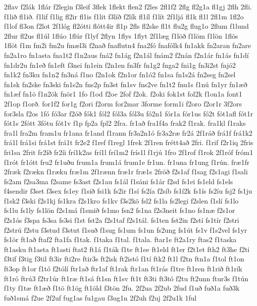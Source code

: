 {2flav
f2lák
1flár
f2legin
f3leif
3flek
1flekt
flen2
f2les
2fl1f2
2flg
fl2g1a
fl1gj
2flh
2fli.
f1lið
fl1ið.
f1lif
f1lig
fl2ir
fl1is
f1lit
f3líð
f2lík
fl1íl
f1lít
2f1ljá
fl1k
fl1l
2fl1m
1fl2o
f1lof
fl3on
f2lot
2f1lóg
fl2ótti
flótt4ir
fl1p
2fls
fl2ske
fl1t
flu2g
flug1o
2flum
f1lund
2flur
fl2us
fl1úl
1flúo
1flúr
f1lyf
2flyn
1flys
1flyt
2f1læg
f1löð
f1löm
f1lön
1flös
1flöt
f1m
fm2i
fm2u
fmæl3i
f2nað
fnaflutn4
fna2fó
fnafólk4
fn1akk
fn2aran
fn2are
fn2a1ro
fn1asta
fna1t2
f1n2aus
fná2
fn1ág
f2n1ál
fnám2
f2nán
f2n1ár
fn1ás
fn1dí
fn1dr2u
fn1eð
fn1eft
f3nei
fn1ein
f2n1en
fn3fr
fn1g2
fnga2
fni1g
fn3i2st
fnjó2
fn1k2
fn3ku
fn1n2
fn3ná
f1no
f2n1ok
f2n1or
fn1ó2
fn1sa
fn1s2á
fn2seg
fn2sel
fn1sk
fn2ske
fn3ski
fn1s2n
fns2p
fn3st
fn1sv
fns2ve
fn1t2
fnu1s
f1nú
fn1yr
fn1æð
fn1æf
fn1ö
f1n2ök
fnör1
1fo
f1od
f2oe
2fof
f2ok.
f2oki
fok1st
fol2k
f1on1a
font1
2f1op
f1orð.
for1f2
for1g
f2ori
f2orm
for2mar
3forme
form1i
f2oro
f2or1r
3f2ors
for3sla
f2os
1fó
fó3ar
f2óð
fók1
fól2
fól3a
fól3u
fó2n1
fór1a
fór1us
fó2t
fót1afl
fót1r
fót1s
2fótt
3fótu
fót1v
f1p
fp2a
fpl2
2fra.
fr1að
fra1f4a
frak2
f1rak.
fra1kl
f1raks
fra1l
fra2m
fram1u
fr1ana
fr1and
f1rann
fr3a2n1ó
fr3a2ræ
fr2á
2f1ráð
frá1f
frá1k2
frá1l
frá1si
frá1st
frá1t
fr2e2
f1ref
f1regl
1frek
2f1ren
frétt4að
2fri.
f1rif
f2r1iq
2fris
fri1sa
2frit
fr2íð
fr2íi
frí1k2as
frí1l
frí1m2
frís1l
f1rjú
1fro
2f1rof
f1rok
2f1róf
fróm1
f1rót
fr1ótt
fru2
fr1uðu
frum1a
frum1á
frum1e
fr1un.
fr1una
fr1ung
f1rún.
fræ1fr
2fræk
f2rækn
f1ræku
fræ1m
2f1rænn
fræ1r
fræ1s
2fröð
f2s1af
f1sag
f2s1agi
f1sali
fs2am
f2sa3ma
f2same
fs3ast
f2s1au
fs1ál
f1sáni
fs1ár
f2sd
fs1ei
fs1eld
fs1els
f4sendir
f3set
f3sex
fs1ey
f1sið
fsi1k
fs2ir
f1sí
fs2ía
f2síb
fs1í2k
fs1ís
fs2íu
fsj2
fs1ju
f1sk2
f3ski
f2s1kj
fs1kra
f2s1kro
fs1kv
f3s2kö
fsl2
fs1la
fs2legi
f2slen
f1slí
fs1lo
fs1lu
fs1ly
fs1lön
f2s1má
f1smið
fs1mo
fsn2
fs1na
f2s3neit
fs1no
fs1næ
f2s1or
f2s1ós
f3spa
fs3sa
fs3si
f1st
fst2a
f2s1taf
f2s1tál.
fs1ten
fst2in
f2stí
fs1tír
f2stri
f2strú
f2stu
f3stud
f3stut
f1suð
f1sug
fs1um
fs1un
fs2ung
fs1út
fs1v
f1s2vel
fs1yr
fs1ör
ft1að
ftaf2
fta1fa
f1tak.
f1taka
f1tal.
f1tala.
ftar1e
ft2a1ry
ftas2
f1taska
ft1asku
ft1asta
ft1asti
ftat2
ft1á
f1ták
f1te
ft1ee
ft1eld
ft1er
f2t1et
fth2
ft3he
f2ti
f3tif
f3tig
f3til
ft3ir
fti2re
ftir3s
ft2isk
ft2istó
f1tí
ftk2
ft1l
f2tn
ftn1a
f1tol
ft1on
ft3op
ft1or
f1tó
f2tólí
ftr1að
ftr1af
ft1rak
ftr1an
ft1rás
f1tre
ft1ren
ft1rið
ft1rík
ft1ró
ftrú3
f2tr1úr
ft1ræ
ft1sá
ft1sn
ft1sv
ft1t
ft3ti
ft3tó
f2tu
ft2unn
ftur3s
f1tún
f1ty
f1tæ
ft1æð
f1tö
ft1ög
ft1öld
f3tön
2fu.
2f2ua
2f2ub
2fud
f1uð
fuð1a
fuð3k
fuð1smá
f2ue
2f2uf
fug1as
fu1gau
f3ug1n
2f2uh
f2uj
2f2u1k
1ful
}
